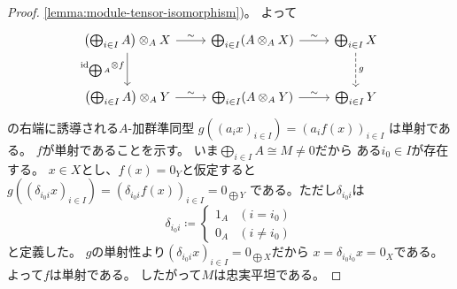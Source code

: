 \documentclass[report]{jlreq}
\begin{document}
\begin{proof}
    \cref{lemma:module-tensor-isomorphism})。
    よって
    \begin{equation}
        \begin{tikzcd}[row sep=large]
            \left(
                \bigoplus_{i \in I} A
            \right) \otimes_A X
                \ar{r}{\sim}
                \ar{d}[swap]{\id_{\bigoplus A} \otimes f}
                & \bigoplus_{i \in I}
                    (A \otimes_A X)
                    \ar{r}{\sim}
                & \bigoplus_{i \in I} X
                    \ar[dashed]{d}{g} \\
            \left(
                \bigoplus_{i \in I} A
            \right) \otimes_A Y
                \ar{r}{\sim}
                & \bigoplus_{i \in I}
                    (A \otimes_A Y)
                    \ar{r}{\sim}
                & \bigoplus_{i \in I} Y
        \end{tikzcd}
    \end{equation}
    の右端に誘導される$A$-加群準同型
    $g((a_i x)_{i \in I}) = (a_i f(x))_{i \in I}$
    は単射である。
    $f$が単射であることを示す。
    いま$\bigoplus_{i \in I} A \cong M \neq 0$だから
    ある$i_0 \in I$が存在する。
    $x \in X$とし、$f(x) = 0_Y$と仮定すると
    $g((\delta_{i_0 i} x)_{i \in I})
        = (\delta_{i_0 i} f(x))_{i \in I}
        = 0_{\bigoplus Y}$
    である。ただし$\delta_{i_0 i}$は
    \begin{equation}
        \delta_{i_0 i} \coloneqq \begin{cases}
            1_A & (i = i_0) \\
            0_A & (i \neq i_0)
        \end{cases}
    \end{equation}
    と定義した。
    $g$の単射性より$(\delta_{i_0 i} x)_{i \in I} = 0_{\bigoplus X}$だから
    $x = \delta_{i_0 i_0} x = 0_X$である。
    よって$f$は単射である。
    したがって$M$は忠実平坦である。


\end{proof}
\end{document}
